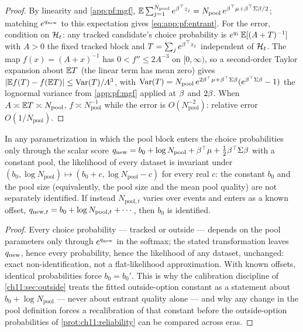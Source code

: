 \begin{proof}
By linearity and \cref{app:pf:mgf}, $\mathbb{E} \sum_{j=1}^{N_{\mathrm{pool}}} e^{\beta^{\top} z_j} =
N_{\mathrm{pool}}\, e^{\beta^{\top} \mu + \beta^{\top} \Sigma \beta/2}$; matching $e^{q_{\mathrm{new}}}$
to this expectation gives \cref{eq:app:pf:entrant}. For the error, condition on $\mathcal{H}_t$: any tracked
candidate's choice probability is $e^{q_i}\, \mathbb{E}[(A + T)^{-1}]$ with $A > 0$ the fixed tracked
block and $T = \sum_j e^{\beta^{\top} z_j}$ independent of $\mathcal{H}_t$. The map $f(x) = (A + x)^{-1}$
has $0 < f'' \le 2 A^{-3}$ on $[0,\infty)$, so a second-order Taylor expansion about $\mathbb{E} T$ (the
linear term has mean zero) gives $\left|\mathbb{E} f(T) - f(\mathbb{E} T)\right| \le \operatorname{Var}(T)/A^3$, with $\operatorname{Var}(T) =
N_{\mathrm{pool}}\, e^{2\beta^{\top}\mu + \beta^{\top}\Sigma\beta}(e^{\beta^{\top}\Sigma\beta} - 1)$ the
lognormal variance from \cref{app:pf:mgf} applied at $\beta$ and $2\beta$. When $A \asymp \mathbb{E} T
\asymp N_{\mathrm{pool}}$, $f \asymp N_{\mathrm{pool}}^{-1}$ while the error is
$O(N_{\mathrm{pool}}^{-2})$: relative error $O(1/N_{\mathrm{pool}})$.
\end{proof}
\begin{proposition}
\label{app:pf:poolident}
In any parametrization in which the pool block enters the choice probabilities only through the
scalar score $q_{\mathrm{new}} = b_0 + \log N_{\mathrm{pool}} + \beta^{\top}\mu + \tfrac12 \beta^{\top}
\Sigma \beta$ with a constant pool, the likelihood of every dataset is invariant under $(b_0, \log
N_{\mathrm{pool}}) \mapsto (b_0 + c, \log N_{\mathrm{pool}} - c)$ for every real $c$: the constant
$b_0$ and the pool size (equivalently, the pool size and the mean pool quality) are not separately
identified. If instead $N_{\mathrm{pool}, t}$ varies over events and enters as a known offset,
$q_{\mathrm{new}, t} = b_0 + \log N_{\mathrm{pool}, t} + \cdots$, then $b_0$ is identified.
\end{proposition}
\begin{proof}
Every choice probability --- tracked or outside --- depends on the pool parameters only through
$e^{q_{\mathrm{new}}}$ in the softmax; the stated transformation leaves $q_{\mathrm{new}}$,
hence every probability, hence the likelihood of any dataset, unchanged: exact non-identification, not
a flat-likelihood approximation. With known offsets, identical probabilities force $b_0 = b_0'$. This
is why the calibration discipline of \cref{ch11:sec:outside} treats the fitted outside-option constant
as a statement about $b_0 + \log N_{\mathrm{pool}}$ --- never about entrant quality alone --- and why
any change in the pool definition forces a recalibration of that constant before the outside-option
probabilities of \cref{prot:ch11:reliability} can be compared across eras.
\end{proof}
